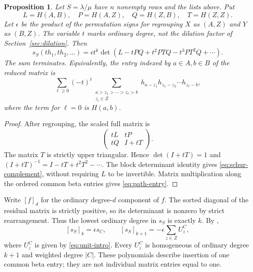 \documentclass[11pt,a4paper]{amsart}
\numberwithin{equation}{section}
\theoremstyle{plain}
\newtheorem{proposition}[theorem]{Proposition}
\theoremstyle{definition}
\begin{document}
\begin{proposition}\label{prop:path-expansion}
Let \(S=\lambda/\mu\) have \(n\) nonempty rows and the lists above.
Put
\[
 L=H(A,B),\quad P=H(A,Z),\quad Q=H(Z,B),\quad T=H(Z,Z).
\]
Let \(\epsilon\) be the product of the permutation signs for regrouping
\(X\) as \((A,Z)\) and \(Y\) as \((B,Z)\).  The variable \(t\) marks ordinary
degree, not the dilation factor of Section~\ref{sec:dilation}.
Then
\begin{equation}\label{eq:schur-complement}
 s_S(th_1,th_2,\ldots)
 =\epsilon t^k\det(L-tPQ+t^2PTQ-t^3PT^2Q+\cdots).
\end{equation}
The sum terminates.  Equivalently, the entry indexed by \(a\in A,b\in B\)
of the reduced matrix is
\begin{equation}\label{eq:path-entry}
 \sum_{\ell\ge0}(-t)^\ell
 \sum_{\substack{a>z_1>\cdots>z_\ell>b\\ z_i\in Z}}
 h_{a-z_1}h_{z_1-z_2}\cdots h_{z_\ell-b},
\end{equation}
where the term for \(\ell=0\) is \(H(a,b)\).
\end{proposition}

\begin{proof}
After regrouping, the scaled full matrix is
\[
 \begin{pmatrix}tL&tP\\tQ&I+tT\end{pmatrix}.
\]
The matrix \(T\) is strictly upper triangular.  Hence
\(\det(I+tT)=1\) and
\((I+tT)^{-1}=I-tT+t^2T^2-\cdots\).
The block determinant identity gives \eqref{eq:schur-complement}, without
requiring \(L\) to be invertible.  Matrix multiplication along the ordered
common beta entries gives \eqref{eq:path-entry}.
\end{proof}

Write \([f]_d\) for the ordinary degree-\(d\) component of \(f\).
The sorted diagonal of the residual matrix is strictly positive, so its
determinant is nonzero by strict rearrangement.  Thus the lowest ordinary
degree in \(s_S\) is exactly \(k\).  By ,
\begin{equation}\label{eq:first-components}
 [s_S]_k=\epsilon s_C,\qquad
 [s_S]_{k+1}=-\epsilon\sum_{z\in Z}U_z^C,
\end{equation}
where \(U_z^C\) is given by \eqref{eq:unit-intro}.  Every \(U_z^C\)
is homogeneous of ordinary degree \(k+1\) and weighted degree \(|C|\).
These polynomials describe insertion of one common beta entry; they are not
individual matrix entries equal to one.
\end{document}
